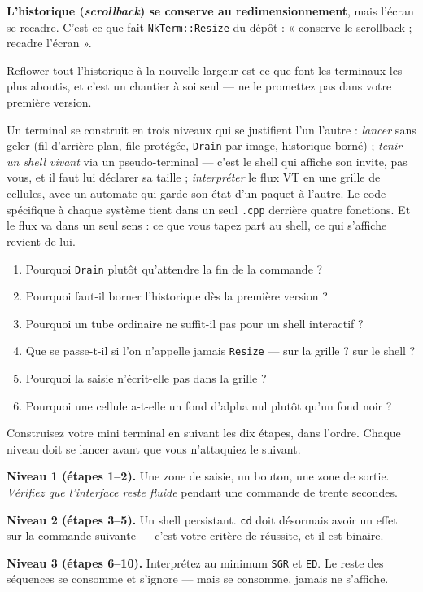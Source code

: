 \begin{nkretenir}
\textbf{L'historique (\emph{scrollback}) se conserve au redimensionnement}, mais
l'écran se recadre. C'est ce que fait \texttt{NkTerm::Resize} du dépôt :
« conserve le scrollback ; recadre l'écran ».

Reflower tout l'historique à la nouvelle largeur est ce que font les terminaux
les plus aboutis, et c'est un chantier à soi seul --- ne le promettez pas dans
votre première version.
\end{nkretenir}

\begin{nkbilan}
Un terminal se construit en trois niveaux qui se justifient l'un l'autre :
\emph{lancer} sans geler (fil d'arrière-plan, file protégée, \texttt{Drain} par
image, historique borné) ; \emph{tenir un shell vivant} via un pseudo-terminal
--- c'est le shell qui affiche son invite, pas vous, et il faut lui déclarer sa
taille ; \emph{interpréter} le flux VT en une grille de cellules, avec un
automate qui garde son état d'un paquet à l'autre. Le code spécifique à chaque
système tient dans un seul \texttt{.cpp} derrière quatre fonctions. Et le flux va
dans un seul sens : ce que vous tapez part au shell, ce qui s'affiche revient de
lui.
\end{nkbilan}

\begin{nkquestions}
\begin{enumerate}
\item Pourquoi \texttt{Drain} plutôt qu'attendre la fin de la commande ?
\item Pourquoi faut-il borner l'historique dès la première version ?
\item Pourquoi un tube ordinaire ne suffit-il pas pour un shell interactif ?
\item Que se passe-t-il si l'on n'appelle jamais \texttt{Resize} --- sur la
      grille ? sur le shell ?
\item Pourquoi la saisie n'écrit-elle pas dans la grille ?
\item Pourquoi une cellule a-t-elle un fond d'alpha nul plutôt qu'un fond noir ?
\end{enumerate}
\end{nkquestions}

\begin{nkpratique}
Construisez votre mini terminal en suivant les dix étapes, dans l'ordre. Chaque
niveau doit se lancer avant que vous n'attaquiez le suivant.

\textbf{Niveau 1 (étapes 1--2).} Une zone de saisie, un bouton, une zone de
sortie. \emph{Vérifiez que l'interface reste fluide} pendant une commande de
trente secondes.

\textbf{Niveau 2 (étapes 3--5).} Un shell persistant. \texttt{cd} doit désormais
avoir un effet sur la commande suivante --- c'est votre critère de réussite, et
il est binaire.

\textbf{Niveau 3 (étapes 6--10).} Interprétez au minimum \texttt{SGR} et
\texttt{ED}. Le reste des séquences se consomme et s'ignore --- mais se consomme,
jamais ne s'affiche.
\end{nkpratique}

